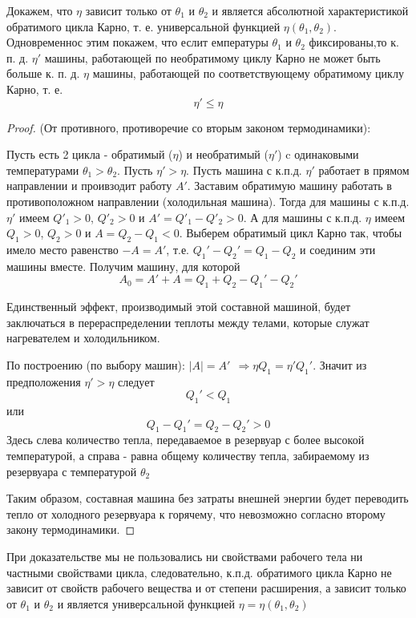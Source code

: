 Докажем, что $\eta$ зависит только от $\theta_1$ и $\theta_2$ и является абсолютной характеристикой обратимого цикла Карно, т. е. универсальной функцией $\eta(\theta_1, \theta_2)$. Одновременнос этим покажем,  что еслит емпературы $\theta_1$ и $\theta_2$ фиксированы,то к. п. д. $\eta'$ машины,  работающей по необратимому циклу Карно не может быть больше к. п. д.  $\eta$ машины, работающей по соответствующему обратимому циклу Карно, т. е.
$$ \eta' \leq \eta $$
\begin{proof}
(От противного, противоречие со вторым законом термодинамики):

Пусть есть 2 цикла - обратимый ($\eta$) и необратимый ($\eta'$) c одинаковыми температурами $\theta_1 > \theta_2$. Пусть $\eta' > \eta$. Пусть машина с к.п.д. $\eta'$ работает в прямом направлении и проивзодит работу $A'$. Заставим обратимую машину работать в противоположном направлении (холодильная машина).  Тогда для машины с к.п.д. $\eta'$ имеем $Q'_1 > 0$, $Q'_2 > 0$ и $A' = Q'_1 - Q'_2 > 0$.  А для машины с к.п.д. $\eta$ имеем $Q_1 > 0$, $Q_2 > 0$ и $A = Q_2 - Q_1 < 0$. Выберем обратимый цикл Карно так, чтобы имело место равенство $-A = A'$, т.е. $Q_1' - Q_2' = Q_1 - Q_2$ и соединим эти машины вместе. Получим машину, для которой $$ A_0 = A' + A = Q_1 + Q_2 - Q_1' - Q_2' $$

Единственный эффект, производимый этой составной машиной, будет заключаться в перераспределении теплоты между телами,  которые служат нагревателем и холодильником.

По построению (по выбору машин): $|A| = A' \ \ \Rightarrow \eta Q_1 = \eta'Q_1' $. Значит из предположения $\eta' > \eta$ следует $$ Q_1' < Q_1 $$
или $$ Q_1 - Q_1' = Q_2 - Q_2' > 0 $$
Здесь слева количество тепла,  передаваемое в резервуар с более высокой температурой, а справа - равна общему количеству тепла, забираемому из резервуара с температурой $\theta_2$

Таким образом, составная машина без затраты внешней энергии будет переводить тепло от холодного резервуара к горячему, что невозможно согласно второму закону термодинамики.

\end{proof} 

При доказательстве мы не пользовались ни свойствами рабочего тела ни частными свойствами цикла, следовательно, к.п.д.  обратимого цикла Карно не зависит от свойств рабочего вещества и от степени расширения,  а зависит только от $\theta_1$ и $\theta_2$ и является универсальной функцией $\eta = \eta(\theta_1, \theta_2)$

